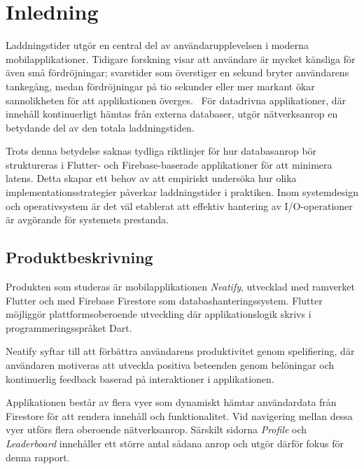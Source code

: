 \documentclass[letterpaper,twocolumn,10pt]{article}
\begin{document}

\section{Inledning}

Laddningstider utgör en central del av användarupplevelsen i moderna
mobilapplikationer. Tidigare forskning visar att användare är mycket känsliga
för även små fördröjningar; svarstider som överstiger en sekund bryter
användarens tankegång, medan fördröjningar på tio sekunder eller mer markant
ökar sannolikheten för att applikationen överges.~\cite{nielsen1993response} För
datadrivna applikationer, där innehåll kontinuerligt hämtas från externa
databaser, utgör nätverksanrop en betydande del av den totala laddningstiden.

Trots denna betydelse saknas tydliga riktlinjer för hur databasanrop bör
struktureras i Flutter- och Firebase-baserade applikationer för att minimera
latens. Detta skapar ett behov av att empiriskt undersöka hur olika
implementationsstrategier påverkar laddningstider i praktiken. Inom
systemdesign och operativsystem är det väl etablerat att effektiv hantering av
I/O-operationer är avgörande för systemets prestanda.~\cite{arpaci2018operating} %


\subsection{Produktbeskrivning}

Produkten som studeras är mobilapplikationen \textit{Neatify}, utvecklad med
ramverket Flutter och med Firebase Firestore som databashanteringssystem.
Flutter möjliggör plattformsoberoende utveckling där applikationslogik skrivs i
programmeringsspråket Dart.~\cite{flutter_faq}

Neatify syftar till att förbättra användarens produktivitet genom
spelifiering, där användaren motiveras att utveckla positiva beteenden genom
belöningar och kontinuerlig feedback baserad på interaktioner i applikationen.

Applikationen består av flera vyer som dynamiskt hämtar användardata från
Firestore för att rendera innehåll och funktionalitet. Vid navigering mellan
dessa vyer utförs flera oberoende nätverksanrop. Särskilt sidorna
\textit{Profile} och \textit{Leaderboard} innehåller ett större antal sådana
anrop och utgör därför fokus för denna rapport.
\end{document}
